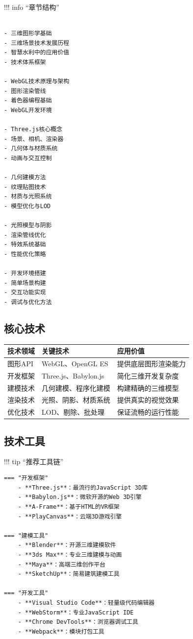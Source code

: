 !!! info ``章节结构''

\begin{verbatim}

- 三维图形学基础
- 三维场景技术发展历程
- 智慧水利中的应用价值
- 技术体系框架

- WebGL技术原理与架构
- 图形渲染管线
- 着色器编程基础
- WebGL开发环境

- Three.js核心概念
- 场景、相机、渲染器
- 几何体与材质系统
- 动画与交互控制

- 几何建模方法
- 纹理贴图技术
- 材质与光照系统
- 模型优化与LOD

- 光照模型与阴影
- 渲染管线优化
- 特效系统基础
- 性能优化策略

- 开发环境搭建
- 简单场景构建
- 交互功能实现
- 调试与优化方法
\end{verbatim}

\subsection{核心技术}\label{ux6838ux5fc3ux6280ux672f}

\begin{longtable}[]{@{}lll@{}}
\toprule\noalign{}
技术领域 & 关键技术 & 应用价值 \\
\midrule\noalign{}
\endhead
\bottomrule\noalign{}
\endlastfoot
图形API & WebGL、OpenGL ES & 提供底层图形渲染能力 \\
开发框架 & Three.js、Babylon.js & 简化三维开发复杂度 \\
建模技术 & 几何建模、程序化建模 & 构建精确的三维模型 \\
渲染技术 & 光照、阴影、材质系统 & 提供真实的视觉效果 \\
优化技术 & LOD、剔除、批处理 & 保证流畅的运行性能 \\
\end{longtable}

\subsection{技术工具}\label{ux6280ux672fux5de5ux5177}

!!! tip ``推荐工具链''

\begin{verbatim}
=== "开发框架"
    - **Three.js**：最流行的JavaScript 3D库
    - **Babylon.js**：微软开源的Web 3D引擎  
    - **A-Frame**：基于HTML的VR框架
    - **PlayCanvas**：云端3D游戏引擎
    
=== "建模工具"
    - **Blender**：开源三维建模软件
    - **3ds Max**：专业三维建模与动画
    - **Maya**：高端三维创作平台
    - **SketchUp**：简易建筑建模工具
    
=== "开发工具"
    - **Visual Studio Code**：轻量级代码编辑器
    - **WebStorm**：专业JavaScript IDE
    - **Chrome DevTools**：浏览器调试工具
    - **Webpack**：模块打包工具
\end{verbatim}

